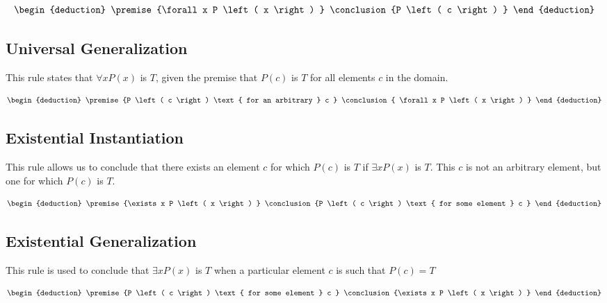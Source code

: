 \documentclass[12pt letter]{report}
\begin{document}
\begin{align*}
  \begin{deduction}
    \premise{\forall x P \left( x \right) }
    \conclusion{P \left( c \right) }
  \end{deduction}
\end{align*}

\subsection{Universal Generalization}

This rule states that $\forall x P \left( x \right) $ is $T$, given the premise that $P \left( c \right) $ is $T$  for
all elements $c$ in the domain.


\begin{align*}
  \begin{deduction}
    \premise{P \left( c \right) \text{ for an arbitrary } c }
    \conclusion{ \forall x P \left( x \right)  }
  \end{deduction}
\end{align*}

\subsection{Existential Instantiation}

This rule allows us to conclude that there exists an element $c$ for which $P \left( c \right) $ is $T$ if $\exists x P
  \left( x \right) $ is $T$. This $c$ is not an arbitrary element, but one for which $P \left( c \right) $ is $T$.

\begin{align*}
  \begin{deduction}
    \premise{\exists x P \left( x \right) }
    \conclusion{P \left( c \right) \text{ for some element } c }
  \end{deduction}
\end{align*}

\subsection{Existential Generalization}

This rule is used to conclude that $\exists x P \left( x \right) $ is $T$  when a particular element $c$ is such that
$P \left( c\right) = T $

\begin{align*}
  \begin{deduction}
    \premise{P \left( c \right) \text{ for some element } c }
    \conclusion{\exists x P \left( x \right) }
  \end{deduction}
\end{align*}
\end{document}
